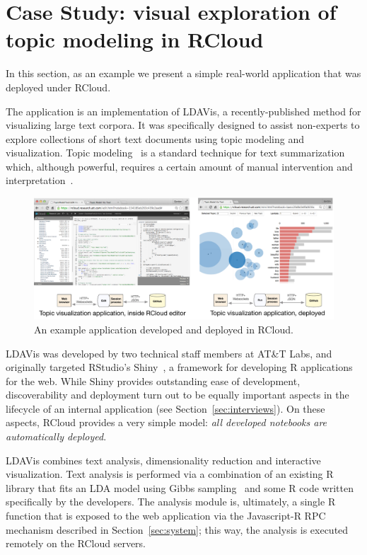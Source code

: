 \section{Case Study\label{sec:casestudy}: visual exploration of topic modeling in RCloud}

In this section, as an example we present a simple real-world
application that was deployed under RCloud.

The application is an implementation of LDAVis, a
recently-published method for visualizing large text corpora.
It was specifically designed to assist non-experts to explore
collections of short text documents using topic modeling and
visualization. Topic modeling~\cite{Blei:2003:LDA} is a standard
technique for text summarization which, although powerful, requires a
certain amount of manual intervention and
interpretation~\cite{Sievert:2014:LAM}.

\begin{figure}
  \includegraphics[width=\linewidth]{fig/casestudytext/casestudytext.pdf}
  \caption{\label{fig:textvis}An example application developed and deployed in RCloud.}
\end{figure}

LDAVis was developed by two technical staff members at
AT\&T Labs, and originally targeted RStudio's
Shiny~\cite{RStudio:2013:SWA}, a framework for developing R
applications for the web.  While Shiny provides outstanding ease of
development, discoverability and deployment turn out to be equally
important aspects in the lifecycle of an internal application (see
Section~\ref{sec:interviews}). On these aspects, RCloud provides a
very simple model: \emph{all developed notebooks are automatically
  deployed}.

LDAVis combines text analysis, dimensionality reduction and
interactive visualization. Text analysis is performed via a
combination of an existing R library that fits an LDA model using
Gibbs sampling~\cite{} and some R code written specifically by the
developers. The analysis module is, ultimately, a single R function
that is exposed to the web application via the Javascript-R RPC
mechanism described in Section~\ref{sec:system}; this way, the
analysis is executed remotely on the RCloud servers.

